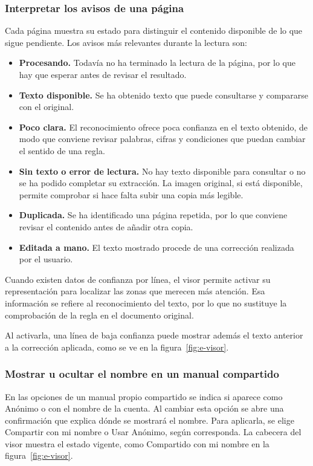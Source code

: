 \subsubsection{Interpretar los avisos de una página}

Cada página muestra su estado para distinguir el contenido disponible de
lo que sigue pendiente. Los avisos más relevantes durante la lectura son:

\begin{itemize}
    \item \textbf{Procesando.} Todavía no ha terminado la lectura de la
    página, por lo que hay que esperar antes de revisar el resultado.
    \item \textbf{Texto disponible.} Se ha obtenido texto que puede
    consultarse y compararse con el original.
    \item \textbf{Poco clara.} El reconocimiento ofrece poca confianza en
    el texto obtenido, de modo que conviene revisar palabras, cifras y
    condiciones que puedan cambiar el sentido de una regla.
    \item \textbf{Sin texto o error de lectura.} No hay texto disponible
    para consultar o no se ha podido completar su extracción. La imagen
    original, si está disponible, permite comprobar si hace falta subir
    una copia más legible.
    \item \textbf{Duplicada.} Se ha identificado una página repetida, por
    lo que conviene revisar el contenido antes de añadir otra copia.
    \item \textbf{Editada a mano.} El texto mostrado procede de una
    corrección realizada por el usuario.
\end{itemize}

Cuando existen datos de confianza por línea, el visor permite activar su
representación para localizar las zonas que merecen más atención. Esa
información se refiere al reconocimiento del texto, por lo que no sustituye
la comprobación de la regla en el documento original.

Al activarla, una línea de baja confianza puede mostrar además el texto
anterior a la corrección aplicada, como se ve en la figura~\ref{fig:e-visor}.

\subsubsection{Mostrar u ocultar el nombre en un manual compartido}

En las opciones de un manual propio compartido se indica si aparece como
\guillemotleft{}Anónimo\guillemotright{} o con el nombre de la cuenta.
Al cambiar esta opción se abre una confirmación que explica dónde se
mostrará el nombre. Para aplicarla, se elige
\guillemotleft{}Compartir con mi nombre\guillemotright{} o
\guillemotleft{}Usar Anónimo\guillemotright{}, según corresponda. La
cabecera del visor muestra el estado vigente, como
\guillemotleft{}Compartido con mi nombre\guillemotright{} en la
figura~\ref{fig:e-visor}.

